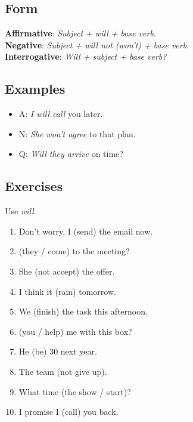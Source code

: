 \documentclass[11pt,a4paper]{article}
\begin{document}
\subsection*{Form}
\textbf{Affirmative}: \emph{Subject + will + base verb}.\\
\textbf{Negative}: \emph{Subject + will not (won’t) + base verb}.\\
\textbf{Interrogative}: \emph{Will + subject + base verb?}

\subsection*{Examples}
\begin{itemize}
  \item A: \emph{I will call} you later.
  \item N: \emph{She won’t agree} to that plan.
  \item Q: \emph{Will they arrive} on time?
\end{itemize}

\subsection*{Exercises}
Use \emph{will}.
\begin{enumerate}
  \item Don’t worry, I \underline{\hspace{2.5cm}} (send) the email now.
  \item \underline{\hspace{2.5cm}} (they / come) to the meeting?
  \item She \underline{\hspace{2.5cm}} (not accept) the offer.
  \item I think it \underline{\hspace{2.5cm}} (rain) tomorrow.
  \item We \underline{\hspace{2.5cm}} (finish) the task this afternoon.
  \item \underline{\hspace{2.5cm}} (you / help) me with this box?
  \item He \underline{\hspace{2.5cm}} (be) 30 next year.
  \item The team \underline{\hspace{2.5cm}} (not give up).
  \item What time \underline{\hspace{2.5cm}} (the show / start)?
  \item I promise I \underline{\hspace{2.5cm}} (call) you back.
\end{enumerate}
\end{document}
